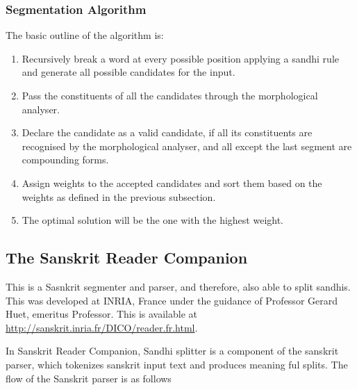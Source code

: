 \documentclass[11pt]{article}
\begin{document}
\subsubsection{Segmentation Algorithm}
The basic outline of the algorithm is\cite{Kumar2010}:
\begin{enumerate}
	\item Recursively break a word at every possible position applying a sandhi rule and generate all possible candidates for the input.
	\item Pass the constituents of all the candidates through the morphological analyser.
	\item Declare the candidate as a valid candidate, if all its constituents are recognised by the morphological analyser, and all except the last segment are compounding forms.
	\item Assign weights to the accepted candidates and sort them based on the weights as defined in the previous subsection.
	\item The optimal solution will be the one with the highest weight.
\end{enumerate}


\subsection{The Sanskrit Reader Companion } This is a Sasnkrit segmenter and parser, and therefore, also able to split sandhis. This was developed at INRIA, France under the guidance of Professor Gerard Huet, emeritus Professor. This is available at \url{http://sanskrit.inria.fr/DICO/reader.fr.html}.


In Sanskrit Reader Companion, Sandhi splitter is a component of the sanskrit parser, which tokenizes sanskrit input text and produces meaning ful splits. The flow of the Sanskrit parser is as follows
\end{document}
